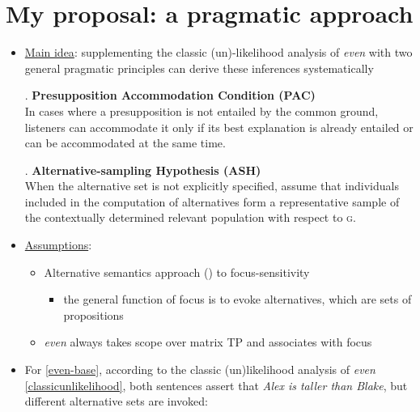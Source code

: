 \documentclass[11pt,letterpaper]{scrartcl}
\begin{document}
\section{My proposal: a pragmatic approach}

\begin{itemize}

    \item \underline{Main idea}: supplementing the classic (un)-likelihood analysis of \textit{even} with two general pragmatic principles can derive these inferences systematically
    
    \ex. \textbf{Presupposition Accommodation Condition (PAC)}\\
    In cases where a presupposition is not entailed by the common ground, listeners can accommodate it only if its best explanation is already entailed or can be accommodated at the same time. %
    
    \ex. \textbf{Alternative-sampling Hypothesis (ASH)} \\ When the alternative set is not explicitly specified, assume that individuals included in the computation of alternatives form a representative sample of the contextually determined relevant population with respect to \textsc{g}.
    
    \item \underline{Assumptions}:
        \begin{itemize}
            \item Alternative semantics approach (\cite{rooth_association_1985}) to focus-sensitivity
                
                \begin{itemize}
                    \item the general function of focus is to evoke alternatives, which are sets of propositions
                \end{itemize}
 
            \item \textit{even} always takes scope over matrix TP and associates with focus
        \end{itemize}
    
    \item For \ref{even-base}, according to the classic (un)likelihood analysis of \textit{even} \ref{classicunlikelihood}, both sentences assert that \textit{Alex is taller than Blake}, but different alternative sets are invoked:


\end{itemize}
\end{document}
